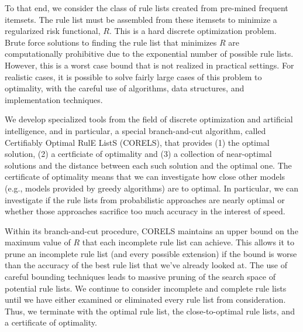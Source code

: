 To that end, we consider the class of rule lists created from pre-mined frequent itemsets. The rule list must be assembled from these itemsets to minimize a regularized risk functional, $R$. This is a hard discrete optimization problem. Brute force solutions to finding the rule list that minimizes $R$ are computationally prohibitive due to the exponential number of possible rule lists. However, this is a worst case bound that is not realized in practical settings. For realistic cases, it is possible to solve fairly large cases of this problem to optimality, with the careful use of algorithms, data structures, and implementation techniques.

We develop specialized tools from the field of discrete optimization and artificial intelligence, and in particular, a special branch-and-cut algorithm, called  Certifiably Optimal RulE ListS (CORELS), that provides (1) the optimal solution, (2) a certficiate of optimality and (3) a collection of near-optimal solutions and the distance between each such solution and the optimal one. The certificate of optimality means that we can investigate how close other models (e.g., models provided by greedy algorithms) are to optimal. In particular, we can investigate if the rule lists from probabilistic approaches are nearly optimal or whether those approaches sacrifice too much accuracy in the interest of speed.

\begin{arxiv}
Within its branch-and-cut procedure, CORELS maintains an upper bound on the maximum value of $R$ that each incomplete rule list can achieve. This allows it to prune an incomplete rule list (and every possible extension) if the bound is worse than the accuracy of the best rule list that we've already looked at. The use of careful bounding techniques leads to massive pruning of the search space of potential rule lists. We continue to consider incomplete and complete rule lists until we have either examined or eliminated every rule list from consideration. Thus, we terminate with the optimal rule list, the close-to-optimal rule lists, and a certificate of optimality.
\end{arxiv}

